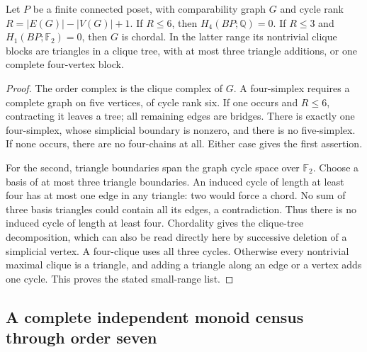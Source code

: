 \begin{lemma}
\label{CP2:A-cycle-budget}
Let $P$ be a finite connected poset, with comparability graph $G$
and cycle rank $R=|E(G)|-|V(G)|+1$.
If $R\le6$, then $H_4(BP;\mathbb Q)=0$.
If $R\le3$ and $H_1(BP;\mathbb F_2)=0$, then $G$ is chordal.
In the latter range its nontrivial clique blocks are triangles
in a clique tree, with at most three triangle additions, or one
complete four-vertex block.
\end{lemma}
\begin{proof}
The order complex is the clique complex of $G$. A four-simplex
requires a complete graph on five vertices, of cycle rank six.
If one occurs and $R\le6$, contracting it leaves a tree; all
remaining edges are bridges. There is exactly one four-simplex,
whose simplicial boundary is nonzero, and there is no
five-simplex. If none occurs, there are no four-chains at all.
Either case gives the first assertion.

For the second, triangle boundaries span the graph cycle space
over $\mathbb F_2$. Choose a basis of at most three triangle
boundaries. An induced cycle of length at least four has at most
one edge in any triangle: two would force a chord. No sum of
three basis triangles could contain all its edges, a
contradiction. Thus there is no induced cycle of length at least
four. Chordality gives the clique-tree decomposition, which can
also be read directly here by successive deletion of a simplicial
vertex. A four-clique uses all three cycles. Otherwise every
nontrivial maximal clique is a triangle, and adding a triangle
along an edge or a vertex adds one cycle. This proves the stated
small-range list.
\end{proof}

\subsection{A complete independent monoid census through order seven}

